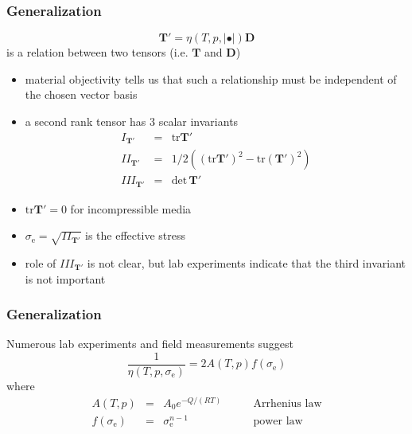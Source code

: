 \documentclass[hide notes,intlimits]{beamer}
\begin{document}
\begin{frame}
  \frametitle{Generalization}
  \begin{equation}
    \mathbf{T}' = \eta\left(T,p,\vert \bullet \vert\right)\mathbf{D}
  \end{equation}
  is a relation between two tensors (i.e. $\mathbf{T}$ and $\mathbf{D}$)
  \begin{itemize}
  \item \alert{material objectivity} tells us that such a relationship must be independent of the chosen vector basis
  \item a second rank tensor has 3 scalar invariants
    \begin{eqnarray}
      I_{\mathbf{T}'} & = & \text{tr}\mathbf{T}' \\
      II_{\mathbf{T}'} & = & 1/2\left(\left(\text{tr}\mathbf{T}'\right)^{2}  -\text{tr}\left(\mathbf{T}'\right)^{2}\right)\\
      III_{\mathbf{T}'} & = & \text{det}\,\mathbf{T}'
    \end{eqnarray}
    \item $\text{tr}\mathbf{T}'=0$ for incompressible media
    \item $\sigma_{\text{e}} = \sqrt{II_{\mathbf{T}'}}$ is the \alert{effective stress}
    \item role of $ III_{\mathbf{T}'}$ is not clear, but lab experiments indicate that the third invariant is not important
  \end{itemize}
\end{frame}

\begin{frame}
  \frametitle{Generalization}
  Numerous lab experiments and field measurements suggest
    \begin{equation}
      \frac{1}{\eta\left(T,p,\sigma_{\text{e}}\right)} =2A\left(T,p\right)f\left(\sigma_{\text{e}}\right)
    \end{equation}
    where
    \begin{equation*}
      \begin{array}{rcll}
      A(T,p) & = & A_{0} e^{-Q/(RT)} &\qquad \text{Arrhenius law}\\[.25em]
      f\left(\sigma_{\text{e}}\right) & = &\sigma_{\text{e}}^{n-1} &\qquad \text{power law}
      \end{array}
    \end{equation*}
\end{frame}
\end{document}
